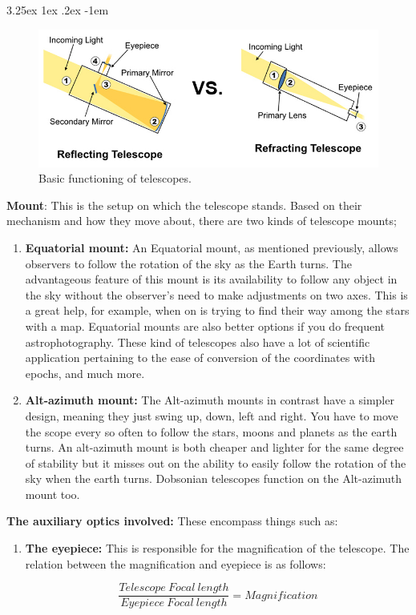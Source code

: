 \documentclass[a4paper,twoside,11pt]{article}
\makeatletter
\numberwithin{equation}{section}
\renewcommand\paragraph{\@startsection{paragraph}{5}{\z@}%
  {3.25ex \@plus1ex \@minus.2ex}%
  {-1em}%
  {\normalfont\normalsize\bfseries}}
\makeatother
\begin{document}
\begin{enumerate}
{\begin{enumerate}
\paragraph{}
\begin{figure}[h]
\includegraphics[width=1.0\linewidth]{fig7.jpg}
\caption{Basic functioning of telescopes.}
\label{fig7}
\end{figure}
\end{enumerate}
\item \textbf{Mount}: This is the setup on which the telescope stands. Based on their mechanism and how they move about, there are two kinds of telescope mounts;
\begin{enumerate}  
\item \textbf{Equatorial mount:} An Equatorial mount, as mentioned previously, allows observers to follow the rotation of the sky as the Earth turns. The advantageous feature of this mount is its availability to follow any object in the sky without the observer's need to make adjustments on two axes. This is a great help, for example, when on is trying to find their way among the stars with a map. Equatorial mounts are also better options if you do frequent astrophotography. These kind of telescopes also have a lot of scientific application pertaining to the ease of conversion of the coordinates with epochs, and much more. 
\item \textbf{Alt-azimuth mount:} The Alt-azimuth mounts in contrast have a simpler design, meaning they just swing up, down, left and right. You have to move the scope every so often to follow the stars, moons and planets as the earth turns. An alt-azimuth mount is both cheaper and lighter for the same degree of stability but it misses out on the ability to easily follow the rotation of the sky when the earth turns. Dobsonian telescopes function on the Alt-azimuth mount too.
\end{enumerate}
}
\item {\textbf{The auxiliary optics involved:} These encompass things such as: 
\begin{enumerate}
\item \textbf{The eyepiece:} This is responsible for the magnification of the telescope. The relation between the magnification and eyepiece is as follows:
\begin{center}
\begin{equation}
\frac{Telescope \ Focal \ length}{Eyepiece \ Focal \ length} = Magnification
\end{equation}
\end{center}


\end{enumerate}}
\end{enumerate}
\end{document}
